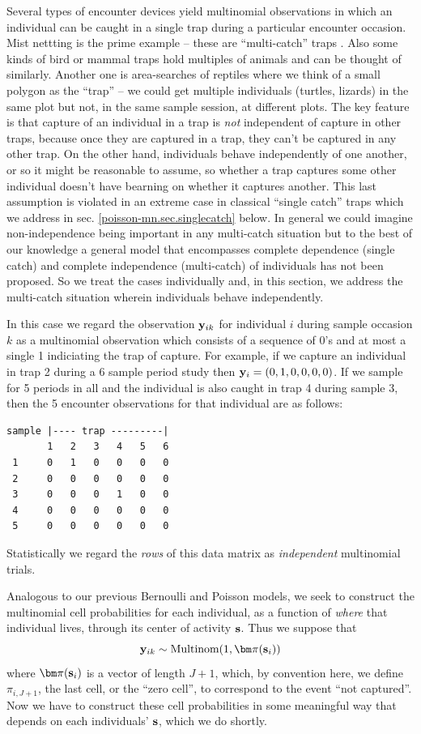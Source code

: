 Several types of encounter devices yield multinomial observations in
which an individual can be caught in a single trap during a particular
encounter occasion.  Mist nettting is the prime example -- these are
``multi-catch'' traps \citep{efford_etal:2009euring}. Also some kinds of
bird or mammal traps hold multiples of animals and can be thought of
similarly. Another one is area-searches of reptiles where we think of
a small polygon as the ``trap'' -- we could get multiple individuals
(turtles, lizards) in the same plot but not, in the same sample
session, at different plots.  The key feature is that capture of an
individual in a trap is {\it not} independent of capture in other
traps, because once they are captured in a trap,
they can't be captured in any other trap.
On the 
other hand, individuals behave independently of one another, or so it
might be reasonable to assume, so whether a trap captures some other
individual doesn't have bearning on whether it captures another.  This
last assumption is violated in an extreme case in classical ``single
catch'' traps which we address in sec. \ref{poisson-mn.sec.singlecatch}
below. In general we could imagine non-independence being important in
any multi-catch situation but to the best of our knowledge a general
model that encompasses complete dependence (single catch) and complete
independence (multi-catch) of individuals has not been proposed.  So
we treat the cases individually and, in this section, we address the
multi-catch situation wherein individuals behave independently.


In this case we regard the observation ${\bf y}_{ik}$ for
individual $i$ during sample occasion $k$ as a multinomial observation
which consists of a sequence of 0's and at most a single 1 indiciating
the trap of capture. For example, if we capture an individual in trap
2 during a 6 sample period study then ${\bf y}_{i} = (0,1,0,0,0,0)$.
If we sample for 5 periods in all and the individual is also caught
in trap 4 during sample 3, then the 5 encounter observations for that
individual are as follows:
\begin{verbatim}
sample |---- trap ---------|
       1   2   3   4   5   6
 1     0   1   0   0   0   0
 2     0   0   0   0   0   0
 3     0   0   0   1   0   0
 4     0   0   0   0   0   0
 5     0   0   0   0   0   0
\end{verbatim}
Statistically we regard the {\it rows} of this data matrix as {\it
  independent} multinomial trials.

Analogous to our previous Bernoulli and Poisson models, we seek to
construct the multinomial cell probabilities for each individual, as a
function of {\it where} that individual lives, through its center of
activity ${\bf s}$. Thus we suppose that
\[
 {\bf y}_{ik} \sim \mbox{Multinom}(1, {\bm \pi}({\bf s}_{i}) )
\]
where ${\bm \pi}({\bf s}_{i})$ is a vector of length $J+1$, which, by
convention here, we define $\pi_{i,J+1}$, the last cell, or the ``zero
cell'', to correspond to the event ``not captured''.  Now we have to
construct these cell probabilities in some meaningful way that depends
on each individuals' ${\bf s}$, which we do shortly.

